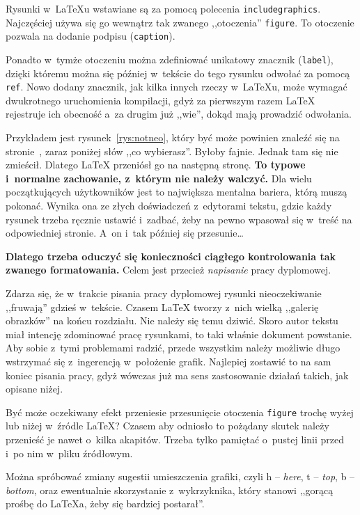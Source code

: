 Rysunki w~\LaTeX{u} wstawiane są za pomocą polecenia \texttt{includegraphics}. Najczęściej używa się go wewnątrz tak zwanego ,,otoczenia'' \texttt{figure}. To otoczenie pozwala na dodanie podpisu (\texttt{caption}).

Ponadto w~tymże otoczeniu można zdefiniować unikatowy znacznik (\texttt{label}), dzięki któremu można się później w~tekście do tego rysunku odwołać za pomocą \texttt{ref}. Nowo dodany znacznik, jak kilka innych rzeczy w~\LaTeX{u}, może wymagać dwukrotnego uruchomienia kompilacji, gdyż za pierwszym razem \LaTeX{} rejestruje ich obecność a~za drugim już ,,wie'', dokąd mają prowadzić odwołania.

Przykładem jest rysunek~\ref{rys:notneo}, który być może powinien znaleźć się na stronie~\pageref{ch:wstep}, zaraz poniżej słów ,,co wybierasz''. Byłoby fajnie. Jednak tam się nie zmieścił. Dlatego \LaTeX{} przeniósł go na następną stronę. \textbf{To typowe i~normalne zachowanie, z~którym nie należy walczyć.} Dla wielu początkujących użytkowników jest to największa mentalna bariera, którą muszą pokonać. Wynika ona ze złych doświadczeń z~edytorami tekstu, gdzie każdy rysunek trzeba ręcznie ustawić i~zadbać, żeby na pewno wpasował się w~treść na odpowiedniej stronie. A~on i~tak później się przesunie\ldots

\textbf{Dlatego trzeba oduczyć się konieczności ciągłego kontrolowania tak zwanego formatowania.} Celem jest przecież \textit{napisanie} pracy dyplomowej.

Zdarza się, że w~trakcie pisania pracy dyplomowej rysunki nieoczekiwanie ,,fruwają'' gdzieś w~tekście. Czasem \LaTeX{} tworzy z~nich wielką ,,galerię obrazków'' na końcu rozdziału. Nie należy się temu dziwić. Skoro autor tekstu miał intencję zdominować pracę rysunkami, to taki właśnie dokument powstanie. Aby sobie z~tymi problemami radzić, przede wszystkim należy możliwie długo wstrzymać się z~ingerencją w~położenie grafik. Najlepiej zostawić to na sam koniec pisania pracy, gdyż wówczas już ma sens zastosowanie działań takich, jak opisane niżej.

Być może oczekiwany efekt przeniesie przesunięcie otoczenia \texttt{figure} trochę wyżej lub niżej w~źródle \LaTeX{}? Czasem aby odniosło to pożądany skutek należy przenieść je nawet o~kilka akapitów. Trzeba tylko pamiętać o~pustej linii przed i~po nim w~pliku źródłowym.

Można spróbować zmiany sugestii umieszczenia grafiki, czyli h -- \textit{here}, t -- \textit{top}, b -- \textit{bottom}, oraz ewentualnie skorzystanie z~wykrzyknika, który stanowi ,,gorącą prośbę do \LaTeX{a}, żeby się bardziej postarał''.

